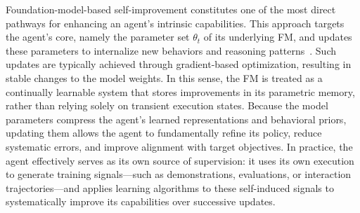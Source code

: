 \documentclass{article}
\begin{document}
Foundation-model-based self-improvement constitutes one of the most direct pathways for enhancing an agent’s intrinsic capabilities. This approach targets the agent’s core, namely the parameter set $\theta_{t}$ of its underlying FM, and updates these parameters to internalize new behaviors and reasoning patterns~\citep{wang2022self, bai2022constitutional, shafayat2025can, bensal2025reflect, dong2025tool, wang2025ragenunderstandingselfevolutionllm, zhou2025selfchallenging}. Such updates are typically achieved through gradient-based optimization, resulting in stable changes to the model weights. In this sense, the FM is treated as a continually learnable system that stores improvements in its parametric memory, rather than relying solely on transient execution states. Because the model parameters compress the agent's learned representations and behavioral priors, updating them allows the agent to fundamentally refine its policy, reduce systematic errors, and improve alignment with target objectives. In practice, the agent effectively serves as its own source of supervision: it uses its own execution to generate training signals—such as demonstrations, evaluations, or interaction trajectories—and applies learning algorithms to these self-induced signals to systematically improve its capabilities over successive updates.
\end{document}
